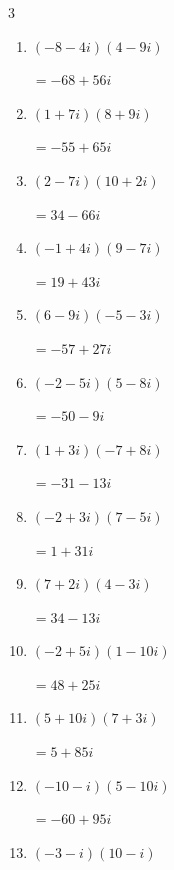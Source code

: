 \begin{multicols}{3}
\begin{enumerate}
        $\displaystyle =-79-53i$

  \item $\displaystyle (-8-4i)(4-9i)$

        $\displaystyle =-68+56i$

  \item $\displaystyle (1+7i)(8+9i)$

        $\displaystyle =-55+65i$

  \item $\displaystyle (2-7i)(10+2i)$

        $\displaystyle =34-66i$

  \item $\displaystyle (-1+4i)(9-7i)$

        $\displaystyle =19+43i$

  \item $\displaystyle (6-9i)(-5-3i)$

        $\displaystyle =-57+27i$

  \item $\displaystyle (-2-5i)(5-8i)$

        $\displaystyle =-50-9i$

  \item $\displaystyle (1+3i)(-7+8i)$

        $\displaystyle =-31-13i$

  \item $\displaystyle (-2+3i)(7-5i)$

        $\displaystyle =1+31i$

  \item $\displaystyle (7+2i)(4-3i)$

        $\displaystyle =34-13i$

\columnbreak %

\resetques

  \item $\displaystyle (-2+5i)(1-10i)$

        $\displaystyle =48+25i$

  \item $\displaystyle (5+10i)(7+3i)$

        $\displaystyle =5+85i$

  \item $\displaystyle (-10-i)(5-10i)$

        $\displaystyle =-60+95i$

  \item $\displaystyle (-3-i)(10-i)$


\end{enumerate}
\end{multicols}
